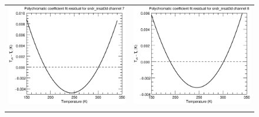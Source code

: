 \begin{figure}[H]
  \centering
  \begin{tabular}{c c}
    \includegraphics[scale=0.35]{graphics/sndr/tfit/sndr_insat3d-7.tfit.eps} &
    \includegraphics[scale=0.35]{graphics/sndr/tfit/sndr_insat3d-8.tfit.eps} \\\\

\end{tabular}
\end{figure}
